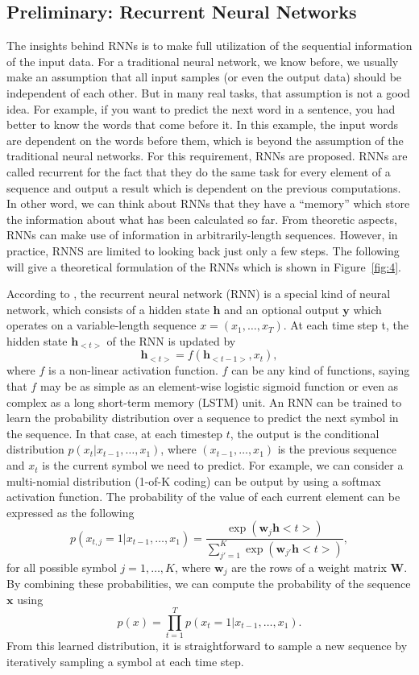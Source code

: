 \subsection{Preliminary: Recurrent Neural Networks}
The insights behind RNNs is to make full utilization of the sequential information of the input data. For a traditional neural network, we know before, we usually make an assumption that all input samples (or even the output data) should be independent of each other. But in many real tasks, that assumption is not a good idea. For example, if you want to predict the next word in a sentence, you had better to know the words that come before it. In this example, the input words are dependent on the words before them, which is beyond the assumption of the traditional neural networks. For this requirement, RNNs are proposed. RNNs are called recurrent for the fact that they do the same task for every element of a sequence and output a result which is dependent on the previous computations. In other word, we can think about RNNs that they have a “memory” which store the information about what has been calculated so far. From theoretic aspects, RNNs can make use of information in arbitrarily-length sequences. However, in practice, RNNS are limited to looking back just only a few steps. The following will give a theoretical formulation of the RNNs which is shown in Figure~\ref{fig:4}.

According to \cite{cho2014learning}, the recurrent neural network (RNN) is a special kind of neural network, which consists of a hidden state $\mathbf{h}$ and an optional output $\mathbf{y}$ which operates on a variable-length sequence $x=\left(x_1,\ldots,x_T\right)$. At each time step t, the hidden state $\mathbf{h}_{<t>}$ of the RNN is updated by 
$$\mathbf{h}_{<t>}=f\left(\mathbf{h}_{<t-1>},x_t\right),$$
where $f$ is a non-linear activation function. $f$ can be any kind of functions, saying that $f$ may be as simple as an element-wise logistic sigmoid function or even as complex as a long short-term memory (LSTM) unit. An RNN can be trained to learn the probability distribution over a sequence to predict the next symbol in the sequence. In that case, at each timestep $t$, the output is the conditional distribution $p\left(x_t| x_{t-1},\ldots,x_1\right)$, where $(x_{t-1},\ldots,x_1)$ is the previous sequence and $x_t$ is the current symbol we need to predict. For example, we can consider a multi-nomial distribution (1-of-K coding) can be output by using a softmax activation function. The probability of the value of each current element can be expressed as the following
$$p\left(x_{t,j}=1| x_{t-1},\ldots,x_1\right)=\frac{\exp(\mathbf{w}_j\mathbf{h}<t>)}{\sum_{j'=1}^{K}\exp(\mathbf{w}_{j'}\mathbf{h}<t>)},$$
for all possible symbol $j=1,\ldots,K$, where $\mathbf{w}_j$ are the rows of a weight matrix $\mathbf{W}$. By combining these probabilities, we can compute the probability of the sequence $\mathbf{x}$ using
$$p\left(x\right)=\prod_{t=1}^{T}{p\left(x_t=1 | x_{t-1},\ldots,x_1\right)}.$$
From this learned distribution, it is straightforward to sample a new sequence by iteratively sampling a symbol at each time step.

